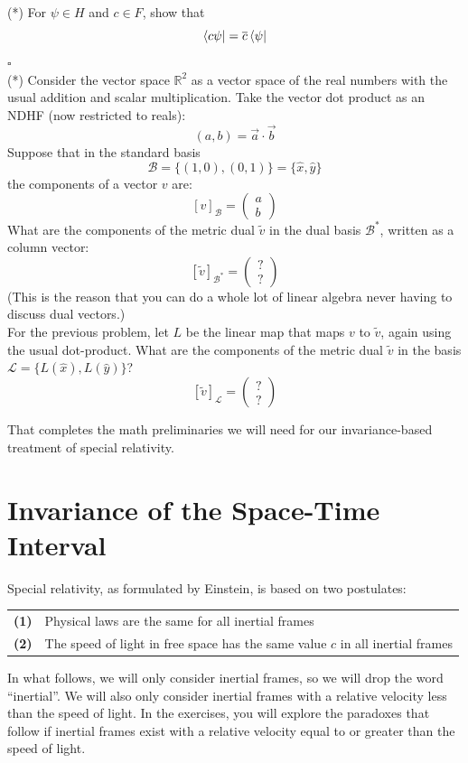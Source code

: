 \documentclass[12pt]{article}
\begin{document}
\exercise (*) For $\psi \in H$ and $c \in F$, show that
$$\bra{c \psi} = \overline{c} \bra{\psi}$$
 $\square$ \\[3pt]

\exercise (*) Consider the vector space $\mathbb{R}^2$ as a vector
space of the real numbers with the usual addition and scalar
multiplication.  Take the vector dot product as an NDHF (now
restricted to reals):
$$(a, b) = \vec{a} \cdot \vec{b}$$
Suppose that in the standard basis
$$\mathcal{B} = \{(1,0), (0,1)\} = \{\hat{x}, \hat{y}\}$$
the components of a vector $v$ are:
$$[v]_\mathcal{B} = \begin{pmatrix} a \\ b \end{pmatrix}$$
What are
the components of the metric dual $\tilde{v}$ in the dual basis
$\mathcal{B}^*$, written as a column vector:
$$[\tilde{v}]_{\mathcal{B}^*} = \begin{pmatrix} ? \\ ? \end{pmatrix}$$
(This is the reason that you can do a whole lot of linear algebra
never having to discuss dual vectors.)\\[3pt]

\exercise For the previous problem, let $L$ be the linear map that
maps $v$ to $\tilde{v}$, again using the usual dot-product.  What are
the components of the metric dual $\tilde{v}$ in the basis
$\mathcal{L}=\{L(\hat{x}), L(\hat{y})\}$?
$$[\tilde{v}]_{\mathcal{L}} = \begin{pmatrix} ? \\ ? \end{pmatrix}$$

\noindent
That completes the math preliminaries we will need for our
invariance-based treatment of special relativity.\\[6pt]


\section{Invariance of the Space-Time Interval}
\label{sec:space-time-interval}

Special relativity, as formulated by Einstein, is based on two postulates:
\begin{center}
\begin{tabular}{ll}
  {\bf (1)} & Physical laws are the same for all inertial frames \\
  {\bf (2)} & The speed of light in free space has the same value $c$ in all inertial frames \\
\end{tabular}
\end{center}
In what follows, we will only consider inertial frames, so we will
drop the word ``inertial''.  We will also only consider inertial
frames with a relative velocity less than the speed of light.  In the
exercises, you will explore the paradoxes that follow if inertial
frames exist with a relative velocity equal to or greater than the
speed of light.
\end{document}
